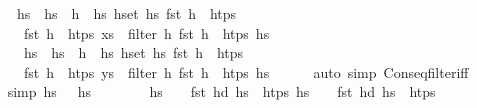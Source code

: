 \begin{isabellebody}
\ \ \ \ \ {\isachardoublequoteopen}hs\ {\isacharequal}{\kern0pt}\ hs{}\ {\isacharat}{\kern0pt}\ h\ {\isacharhash}{\kern0pt}\ hs{}{\isachardoublequoteclose}\ {\isachardoublequoteopen}{\isacharparenleft}{\kern0pt}{\isasymforall}h{\isasymin}set\ hs{}{\isachardot}{\kern0pt}\ fst\ h\ {\isasymnotin}\ htps{\isacharparenright}{\kern0pt}{\isachardoublequoteclose}\isanewline
\ \ \ \ \ \ {\isachardoublequoteopen}fst\ h\ {\isasymin}\ htps{\isachardoublequoteclose}\ {\isachardoublequoteopen}xs\ {\isacharequal}{\kern0pt}\ filter\ {\isacharparenleft}{\kern0pt}{\isasymlambda}h{\isachardot}{\kern0pt}\ fst\ h\ {\isasymin}\ htps{\isacharparenright}{\kern0pt}\ hs{}{\isachardoublequoteclose}\isanewline
\isanewline
\ \ \ \ \ \ {\isachardoublequoteopen}hs{\isacharprime}{\kern0pt}\ {\isacharequal}{\kern0pt}\ hs{}{\isacharprime}{\kern0pt}\ {\isacharat}{\kern0pt}\ h{\isacharprime}{\kern0pt}\ {\isacharhash}{\kern0pt}\ hs{}{\isacharprime}{\kern0pt}{\isachardoublequoteclose}\ {\isachardoublequoteopen}{\isacharparenleft}{\kern0pt}{\isasymforall}h{\isasymin}set\ hs{}{\isacharprime}{\kern0pt}{\isachardot}{\kern0pt}\ fst\ h\ {\isasymnotin}\ htps{\isacharparenright}{\kern0pt}{\isachardoublequoteclose}\isanewline
\ \ \ \ \ \ {\isachardoublequoteopen}fst\ h{\isacharprime}{\kern0pt}\ {\isasymin}\ htps{\isachardoublequoteclose}\ {\isachardoublequoteopen}ys\ {\isacharequal}{\kern0pt}\ filter\ {\isacharparenleft}{\kern0pt}{\isasymlambda}h{\isachardot}{\kern0pt}\ fst\ h\ {\isasymin}\ htps{\isacharparenright}{\kern0pt}\ hs{}{\isacharprime}{\kern0pt}{\isachardoublequoteclose}\isanewline
\ \ \ \ \isamarkupfalse%
\ {\isacharparenleft}{\kern0pt}auto\ simp{\isacharcolon}{\kern0pt}\ Cons{\isacharunderscore}{\kern0pt}eq{\isacharunderscore}{\kern0pt}filter{\isacharunderscore}{\kern0pt}iff{\isacharparenright}{\kern0pt}\isanewline
\ \ \isamarkupfalse%
\ {\isacharbrackleft}{\kern0pt}simp{\isacharbrackright}{\kern0pt}{\isacharcolon}{\kern0pt}\ {\isachardoublequoteopen}hs{}\ {\isacharequal}{\kern0pt}\ {\isacharbrackleft}{\kern0pt}{\isacharbrackright}{\kern0pt}{\isachardoublequoteclose}\ {\isachardoublequoteopen}hs{}{\isacharprime}{\kern0pt}\ {\isacharequal}{\kern0pt}\ {\isacharbrackleft}{\kern0pt}{\isacharbrackright}{\kern0pt}{\isachardoublequoteclose}\isanewline
\ \ \ \ \isamarkupfalse%
\ {\isacartoucheopen}hs{\isacharprime}{\kern0pt}\ {\isasymnoteq}\ {\isacharbrackleft}{\kern0pt}{\isacharbrackright}{\kern0pt}\ {\isasymLongrightarrow}\ fst\ {\isacharparenleft}{\kern0pt}hd\ hs{\isacharprime}{\kern0pt}{\isacharparenright}{\kern0pt}\ {\isasymin}\ htps{\isacartoucheclose}\ {\isacartoucheopen}hs\ {\isasymnoteq}\ {\isacharbrackleft}{\kern0pt}{\isacharbrackright}{\kern0pt}\ {\isasymLongrightarrow}\ fst\ {\isacharparenleft}{\kern0pt}hd\ hs{\isacharparenright}{\kern0pt}\ {\isasymin}\ htps{\isacartoucheclose}\isanewline

\end{isabellebody}
